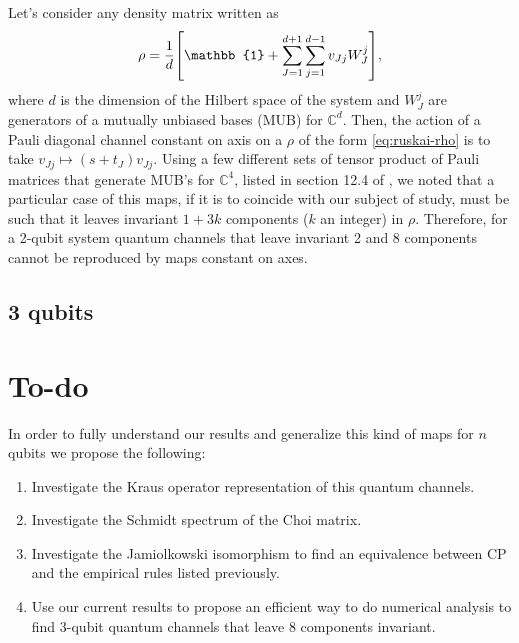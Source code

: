 \documentclass[11pt,dvipsnames]{article} %
\begin{document}
Let's consider any density matrix written as
\begin{align}
	\rho = \frac{1}{d}\qty[\mathbb{1} + \sum _{J=1}^{d+1} \sum _{j=1}^{d-1}
	v_{Jj}W_J^j],
	\label{eq:ruskai-rho}
\end{align}
where $d$ is the dimension of the Hilbert space of the system and $W_J^j$ 
are generators of a mutually unbiased bases (MUB) for $\mathbb{C}^{d}$. Then,
the action of a Pauli diagonal channel constant on axis on a $\rho$ of the form
\eqref{eq:ruskai-rho} is to take $v_{Jj}\mapsto (s+t_J)v_{Jj}$. Using a few
different sets of tensor product of Pauli matrices that generate MUB's for
$\mathbb{C}^4$, listed in section 12.4 of \cite{bengtsson_zyczkowski_2017}, 
we noted that a particular case of this maps, if it is to coincide with our subject of
study, must be such that it leaves invariant $1+3k$ components ($k$ an integer)
in $\rho$. Therefore, for a 2-qubit system quantum channels that leave 
invariant 2 and 8 components cannot be reproduced by maps constant on axes. 
\subsection*{3 qubits} %

\section*{To-do} %
In order to fully understand our results and generalize this kind of maps 
for $n$ qubits we propose the following:
\begin{enumerate}
\item Investigate the Kraus operator representation of this quantum channels.
\item Investigate the Schmidt spectrum of the Choi matrix.
\item Investigate the Jamiolkowski isomorphism to find an equivalence between
CP and the empirical rules listed previously.
\item Use our current results to propose an efficient way to do numerical
analysis to find 3-qubit quantum channels that leave 8 components invariant.
\end{enumerate}


\vfill
\end{document}
